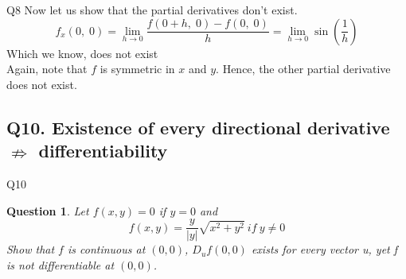 \documentclass[handout,aspectratio=169]{beamer}
\newtheorem{qsn}{Question}
\begin{document}
\begin{frame}{Q8}
	Now let us show that the partial derivatives don't exist.\\
	\pause
	$$f_x(0,\;0) = \lim_{h\to 0}\frac{f(0 + h,\; 0) - f(0,\;0)}{h} = \lim_{h\to 0}\sin\left(\frac{1}{h}\right)$$
	\pause
	Which we know, does not exist\\[1mm]
	\pause
	Again, note that $f$ is symmetric in $x$ and $y$. Hence, the other partial derivative does not exist.
\end{frame}

\subsection{Q10. Existence of every directional derivative $\nRightarrow$ differentiability}

\begin{frame}{Q10}
   \begin{qsn}
       Let $f(x,y) = 0$ if $y=0$ and 
       $$
        f(x,y) = \frac{y}{|y|} \sqrt{x^2 + y^2}~if~y \ne 0
       $$
       Show that $f$ is continuous at $(0, 0)$, $D_uf(0, 0)$ exists for every vector u, yet f is not differentiable at $(0, 0)$.
   \end{qsn}
\end{frame}
\end{document}
